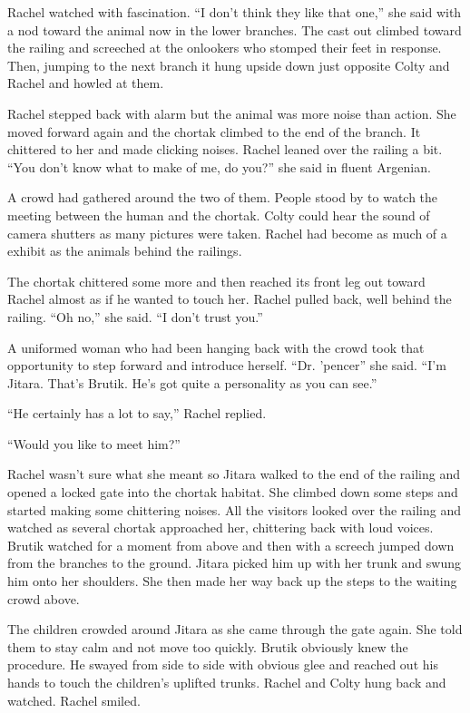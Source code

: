 Rachel watched with fascination. ``I don't think they like that one,'' she said with a nod
toward the animal now in the lower branches. The cast out climbed toward the railing and
screeched at the onlookers who stomped their feet in response. Then, jumping to the next branch
it hung upside down just opposite Colty and Rachel and howled at them.

Rachel stepped back with alarm but the animal was more noise than action. She moved forward
again and the chortak climbed to the end of the branch. It chittered to her and made clicking
noises. Rachel leaned over the railing a bit. ``You don't know what to make of me, do you?'' she
said in fluent Argenian.

A crowd had gathered around the two of them. People stood by to watch the meeting between the
human and the chortak. Colty could hear the sound of camera shutters as many pictures were
taken. Rachel had become as much of a exhibit as the animals behind the railings.

The chortak chittered some more and then reached its front leg out toward Rachel almost as if he
wanted to touch her. Rachel pulled back, well behind the railing. ``Oh no,'' she said. ``I don't
trust you.''

A uniformed woman who had been hanging back with the crowd took that opportunity to step forward
and introduce herself. ``Dr. 'pencer'' she said. ``I'm Jitara. That's Brutik. He's got quite a
personality as you can see.''

``He certainly has a lot to say,'' Rachel replied.

``Would you like to meet him?''

Rachel wasn't sure what she meant so Jitara walked to the end of the railing and opened a locked
gate into the chortak habitat. She climbed down some steps and started making some chittering
noises. All the visitors looked over the railing and watched as several chortak approached her,
chittering back with loud voices. Brutik watched for a moment from above and then with a screech
jumped down from the branches to the ground. Jitara picked him up with her trunk and swung him
onto her shoulders. She then made her way back up the steps to the waiting crowd above.

The children crowded around Jitara as she came through the gate again. She told them to stay
calm and not move too quickly. Brutik obviously knew the procedure. He swayed from side to side
with obvious glee and reached out his hands to touch the children's uplifted trunks. Rachel and
Colty hung back and watched. Rachel smiled.

